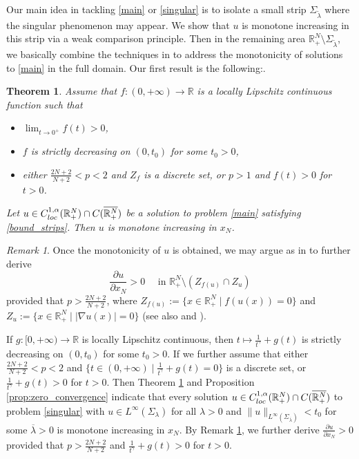 \documentclass[reqno]{amsart}
\theoremstyle{plain}
\newtheorem{theorem}{Theorem}
\theoremstyle{definition}
\theoremstyle{remark}
\newtheorem{remark}{Remark}
\begin{document}
	Our main idea in tackling \eqref{main} or \eqref{singular} is to isolate a small strip $\Sigma_{\tilde{\lambda}}$ where the singular phenomenon may appear. We show that $u$ is monotone increasing in this strip via a weak comparison principle. Then in the remaining area $\mathbb{R}^N_+\setminus\Sigma_{\tilde{\lambda}}$, we basically combine the techniques in \cite{MR3303939,MR2886112,MR4439897,MR3752525,MR3118616} to address the monotonicity of solutions to \eqref{main} in the full domain. Our first result is the following:.
	\begin{theorem}\label{th:monotonicity} Assume that $f:(0,+\infty)\to\mathbb{R}$ is a locally Lipschitz continuous function such that
		\begin{itemize}
			\item[(i)] $\lim_{t\to0^+} f(t) > 0$,
			\item[(ii)] $f$ is strictly decreasing on $(0,t_0)$ for some $t_0>0$,
			\item[(iii)] either $\frac{2N+2}{N+2} < p < 2$ and $Z_f$ is a discrete set, or $p>1$ and $f(t)>0$ for $t>0$.
		\end{itemize}
		Let $u \in C^{1,\alpha}_{\rm loc}(\mathbb{R}^N_+) \cap C(\overline{\mathbb{R}^N_+})$ be a solution to problem \eqref{main} satisfying \eqref{bound_strips}.
		Then $u$ is monotone increasing in $x_N$.
	\end{theorem}
	
	\begin{remark}\label{rem:1}
		Once the monotonicity of $u$ is obtained, we may argue as in \cite[Lemma 14]{10.1007/s11118-024-10157-1} to further derive
		\[
		\frac{\partial u}{\partial x_N} > 0 \quad\text{ in } \mathbb{R}^N_+\setminus(Z_{f(u)}\cap Z_u)
		\]
		provided that $p>\frac{2N+2}{N+2}$, where $Z_{f(u)}:=\{x\in\mathbb{R}^N_+ \mid f(u(x))=0\}$ and $Z_u:=\{x\in\mathbb{R}^N_+ \mid |\nabla u(x)|=0\}$ (see also \cite[Theorem 1.2]{MR2188744} and \cite[Theorem 1.1]{MR4439897}).
	\end{remark}
	
	If $g:[0,+\infty)\to\mathbb{R}$ is locally Lipschitz continuous, then $t\mapsto \frac{1}{t^\gamma} + g(t)$ is strictly decreasing on $(0,t_0)$ for some $t_0>0$.
	If we further assume that either $\frac{2N+2}{N+2} < p < 2$ and $\{t\in(0,+\infty) \mid \frac{1}{t^\gamma} + g(t)=0\}$ is a discrete set, or $\frac{1}{t^\gamma} + g(t)>0$ for $t>0$. Then Theorem \ref{th:monotonicity} and Proposition \ref{prop:zero_convergence} indicate that every solution $u \in C^{1,\alpha}_{\rm loc}(\mathbb{R}^N_+) \cap C(\overline{\mathbb{R}^N_+})$ to problem \eqref{singular} with $u\in L^\infty(\Sigma_\lambda)$ for all $\lambda>0$ and $\|u\|_{L^\infty(\Sigma_{\overline\lambda})} < t_0$ for some $\overline\lambda>0$ is monotone increasing in $x_N$. By Remark \ref{rem:1}, we further derive $\frac{\partial u}{\partial x_N} > 0$ provided that $p>\frac{2N+2}{N+2}$ and $\frac{1}{t^\gamma} + g(t)>0$ for $t>0$.
	
\end{document}
